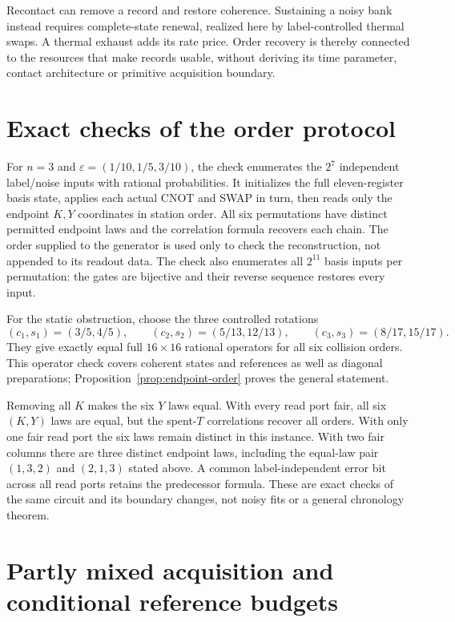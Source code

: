 \documentclass[12pt,a4paper]{article}
\begin{document}
Recontact can remove a record and restore coherence. Sustaining a
noisy bank instead requires complete-state renewal, realized here by
label-controlled thermal swaps. A thermal exhaust adds its rate price.
Order recovery is thereby connected to the resources that make
records usable, without deriving its time parameter, contact
architecture or primitive acquisition boundary.

\appendix

\section{Exact checks of the order protocol}
\label{app:order-checks}

For $n=3$ and
$\varepsilon=(1/10,1/5,3/10)$, the check enumerates the $2^7$
independent label/noise inputs with rational probabilities.
It initializes the full eleven-register basis state, applies each
actual CNOT and SWAP in turn, then reads only the endpoint $K,Y$
coordinates in station order. All six permutations have distinct
permitted endpoint laws and the correlation formula recovers each
chain. The order supplied to the generator is used only to check the
reconstruction, not appended to its readout data.
The check also enumerates all $2^{11}$ basis inputs per permutation:
the gates are bijective and their reverse sequence restores every input.

For the static obstruction, choose the three controlled rotations
\[
 (c_1,s_1)=(3/5,4/5),\qquad
 (c_2,s_2)=(5/13,12/13),\qquad
 (c_3,s_3)=(8/17,15/17).
\]
They give exactly equal full $16\times16$ rational operators for all
six collision orders.
This operator check covers coherent states and references as well
as diagonal preparations; Proposition~\ref{prop:endpoint-order}
proves the general statement.

Removing all $K$ makes the six $Y$ laws equal.
With every read port fair, all six $(K,Y)$ laws are equal, but the
spent-$T$ correlations recover all orders. With only one fair read
port the six laws remain distinct in this instance.
With two fair columns there are three distinct endpoint laws,
including the equal-law pair $(1,3,2)$ and $(2,1,3)$ stated above.
A common label-independent error bit across all read ports retains
the predecessor formula. These are exact checks of the same circuit
and its boundary changes, not noisy fits or a general chronology
theorem.

\section{Partly mixed acquisition and conditional reference budgets}
\label{app:acquisition-details}
\end{document}
